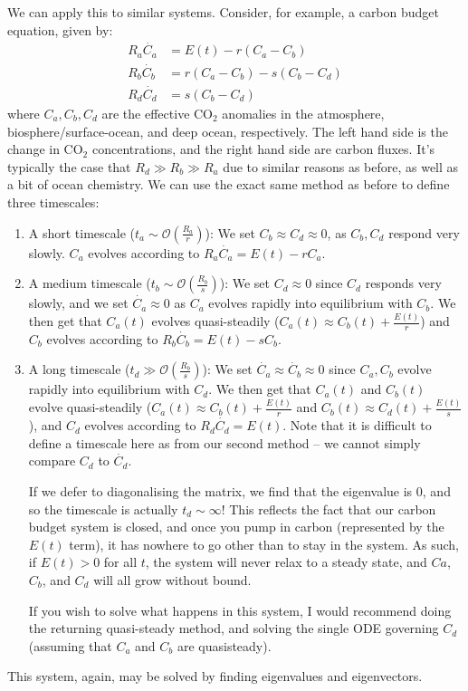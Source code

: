 We can apply this to similar systems. Consider, for example, a carbon budget equation, given by:
\begin{align}
    R_a \dot{C_a} &= E(t)-r (C_a-C_b) \\ 
    R_b \dot{C_b} &= r (C_a-C_b) - s (C_b-C_d)\\
    R_d \dot{C_d} &=  s (C_b-C_d)
\end{align}
where $C_a,C_b,C_d$ are the effective CO$_2$ anomalies in the atmosphere, biosphere/surface-ocean, and deep ocean, respectively. The left hand side is the change in CO$_2$ concentrations, and the right hand side are carbon fluxes. It's typically the case that $R_d\gg R_b\gg R_a$ due to similar reasons as before, as well as a bit of ocean chemistry. We can use the exact same method as before to define three timescales:
\begin{enumerate}
    \item A short timescale ($t_a\sim\mathcal{O}\left(\frac{R_a}{r}\right)$):  We set $C_b\approx C_d\approx 0$, as $C_b,C_d$ respond very slowly. $C_a$ evolves according to $R_a \dot{C_a} = E(t)-r C_a$.
    \item A medium timescale ($t_b\sim\mathcal{O}\left(\frac{R_b}{s}\right)$): We set $C_d \approx 0$ since $C_d$ responds very slowly, and we set $\dot{C_a} \approx 0$ as $C_a$ evolves rapidly into equilibrium with $C_b$. We then get that $C_a(t)$ evolves quasi-steadily ($C_a(t)\approx C_b(t)+\frac{E(t)}{r}$) and $C_b$ evolves according to $R_b \dot{C_b}=E(t)-sC_b$.
    \item A long timescale ($t_d\gg\mathcal{O}\left(\frac{R_b}{s}\right)$): We set $\dot{C_a}\approx \dot{C_b} \approx 0$ since $C_a,C_b$ evolve rapidly into equilibrium with $C_d$. We then get that $C_a(t)$ and $C_b(t)$ evolve quasi-steadily ($C_a(t)\approx C_b(t)+\frac{E(t)}{r}$ and $C_b(t)\approx C_d(t) +\frac{E(t)}{s}$), and $C_d$ evolves according to $R_d \dot{C_d}=E(t)$. Note that it is difficult to define a timescale here as from our second method – we cannot simply compare $C_d$ to $\dot{C_d}$. 
    
    If we defer to diagonalising the matrix, we find that the eigenvalue is $0$, and so the timescale is actually $t_d\sim\infty$! This reflects the fact that our carbon budget system is closed, and once you pump in carbon (represented by the $E(t)$ term), it has nowhere to go other than to stay in the system. As such, if $E(t)>0$ for all $t$, the system will never relax to a steady state, and $Ca$, $C_b$, and $C_d$ will all grow without bound.

    If you wish to solve what happens in this system, I would recommend doing the returning quasi-steady method, and solving the single ODE governing $C_d$ (assuming that $C_a$ and $C_b$ are quasisteady). 
\end{enumerate}
This system, again, may be solved by finding eigenvalues and eigenvectors. 

